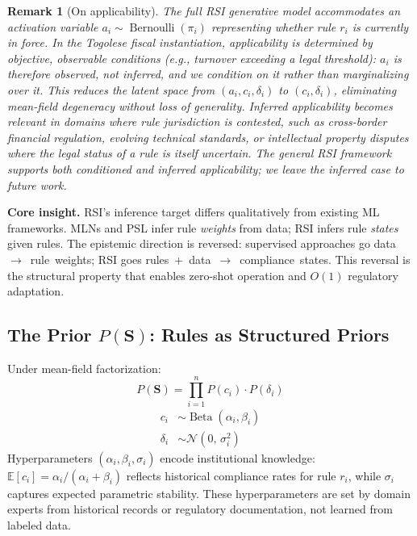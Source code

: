 \documentclass[letterpaper]{article}
\newtheorem{remark}{Remark}
\begin{document}
\begin{remark}[On applicability]
The full RSI generative model accommodates an activation variable
$a_i \sim \operatorname{Bernoulli}(\pi_i)$ representing whether rule
$r_i$ is currently in force. In the Togolese fiscal instantiation,
applicability is determined by objective, observable conditions (e.g.,
turnover exceeding a legal threshold): $a_i$ is therefore
\emph{observed}, not inferred, and we condition on it rather than
marginalizing over it. This reduces the latent space from
$(a_i, c_i, \delta_i)$ to $(c_i, \delta_i)$, eliminating mean-field
degeneracy without loss of generality. Inferred applicability becomes
relevant in domains where rule jurisdiction is contested, such as
cross-border financial regulation, evolving technical standards, or
intellectual property disputes where the legal status of a rule is
itself uncertain. The general RSI framework supports both conditioned
and inferred applicability; we leave the inferred case to future work.
\end{remark}

\noindent\textbf{Core insight.} RSI's inference target differs
qualitatively from existing ML frameworks. MLNs and PSL infer rule
\emph{weights} from data; RSI infers rule \emph{states} given rules.
The epistemic direction is reversed: supervised approaches go
data~$\to$~rule~weights; RSI goes rules~+~data~$\to$~compliance~states.
This reversal is the structural property that enables zero-shot
operation and $O(1)$ regulatory adaptation.

\subsection{The Prior $P(\mathbf{S})$: Rules as Structured Priors}

Under mean-field factorization:
\[
  P(\mathbf{S}) = \prod_{i=1}^n P(c_i) \cdot P(\delta_i)
\]
\begin{align}
  c_i &\sim \operatorname{Beta}(\alpha_i, \beta_i) \\
  \delta_i &\sim \mathcal{N}(0,\, \sigma_i^2)
\end{align}
Hyperparameters $(\alpha_i, \beta_i, \sigma_i)$ encode institutional
knowledge: $\mathbb{E}[c_i] = \alpha_i/(\alpha_i+\beta_i)$ reflects
historical compliance rates for rule $r_i$, while $\sigma_i$ captures
expected parametric stability. These hyperparameters are set by domain
experts from historical records or regulatory documentation, not
learned from labeled data.
\end{document}
